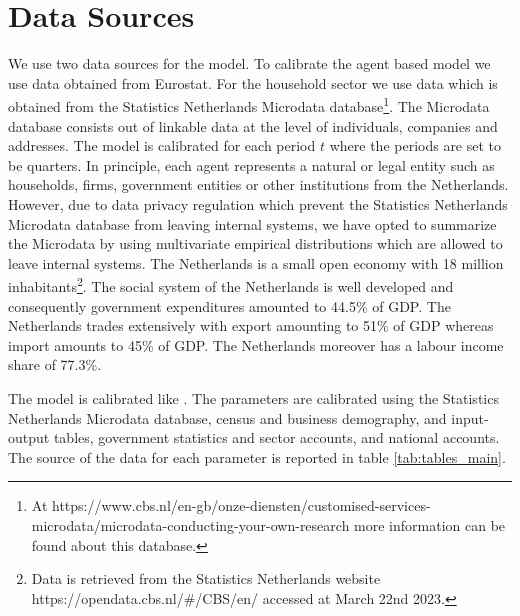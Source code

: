 
\section{Data Sources}
We use two data sources for the model. To calibrate the agent based model we use data obtained from Eurostat. For the household sector we use data which is obtained from the Statistics Netherlands Microdata database\footnote{At https://www.cbs.nl/en-gb/onze-diensten/customised-services-microdata/microdata-conducting-your-own-research more information can be found about this database.}. The Microdata database consists out of linkable data at the level of individuals, companies and addresses. The model is calibrated for each period $t$ where the periods are set to be quarters. In principle, each agent represents a natural or legal entity such as households, firms, government entities or other institutions from the Netherlands. However, due to data privacy regulation which prevent the Statistics Netherlands Microdata database from leaving internal systems, we have opted to summarize the Microdata by using multivariate empirical distributions which are allowed to leave internal systems. The Netherlands is a small open economy with 18 million inhabitants\footnote{Data is retrieved from the Statistics Netherlands website https://opendata.cbs.nl/\#/CBS/en/ accessed at March 22nd 2023.}. The social system of the Netherlands is well developed and consequently government expenditures amounted to 44.5\% of GDP. The Netherlands trades extensively with export amounting to 51\% of GDP whereas import amounts to 45\% of GDP. The Netherlands moreover has a labour income share of 77.3\%.

The model is calibrated like \cite{poledna_economic_2019}. The parameters are calibrated using the Statistics Netherlands Microdata database, census and business demography, and input-output tables, government statistics and sector accounts, and national accounts. The source of the data for each parameter is reported in table \ref{tab:tables_main}.  

